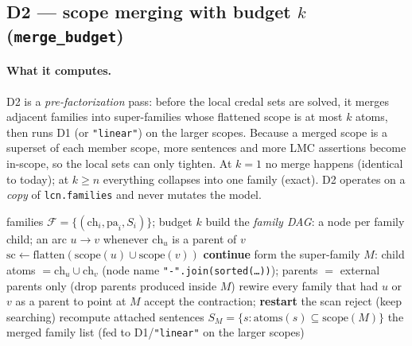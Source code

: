\documentclass[11pt]{article}
\begin{document}
\subsection{D2 --- scope merging with budget $k$ (\texttt{merge\_budget})}
\label{sec:d2-detail}

\paragraph{What it computes.} D2 is a \emph{pre-factorization} pass: before the local credal
sets are solved, it merges adjacent families into super-families whose flattened scope is at
most $k$ atoms, then runs D1 (or \texttt{"linear"}) on the larger scopes. Because a merged
scope is a superset of each member scope, more sentences and more LMC assertions become
in-scope, so the local sets can only tighten. At $k{=}1$ no merge happens (identical to
today); at $k\ge n$ everything collapses into one family (exact). D2 operates on a
\emph{copy} of \texttt{lcn.families} and never mutates the model.

\begin{algorithm}[t]
\caption{D2 family merging (\texttt{\_merge\_families})}
\label{alg:d2}
\begin{algorithmic}[1]
\Require families $\mathcal F=\{(\mathrm{ch}_i,\mathrm{pa}_i,S_i)\}$; budget $k$
\State build the \emph{family DAG}: a node per family child; an arc $u\!\to\!v$ whenever
  $\mathrm{ch}_u$ is a parent of $v$
\Repeat
     \State $\mathrm{sc} \gets \mathrm{flatten}(\mathrm{scope}(u)\cup\mathrm{scope}(v))$
      \textbf{continue} \EndIf
     \State form the super-family $M$: child atoms $=\mathrm{ch}_u\cup\mathrm{ch}_v$ (node name
       \texttt{"-".join(sorted(\dots))}); parents $=$ external parents only (drop parents
       produced inside $M$)
     \State rewire every family that had $u$ or $v$ as a parent to point at $M$
      accept the contraction; \textbf{restart} the scan
     \Else{} reject (keep searching) 
     \EndIf
  \EndFor
{}
  \State recompute attached sentences $S_M=\{s: \mathrm{atoms}(s)\subseteq\mathrm{scope}(M)\}$
\EndFor
\State \Return the merged family list (fed to D1/\texttt{"linear"} on the larger scopes)
\end{algorithmic}
\end{algorithm}
\end{document}
